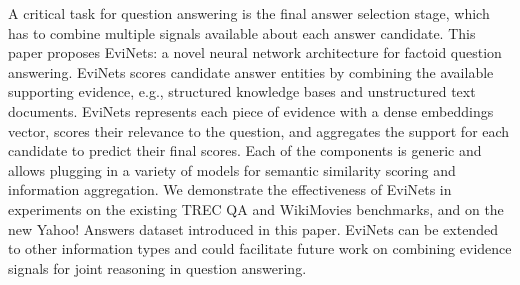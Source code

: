 A critical task for question answering is the final answer selection stage, which has to combine multiple signals available about each answer candidate. This paper proposes EviNets: a novel neural network architecture for factoid question answering. EviNets scores candidate answer entities by combining the available supporting evidence, e.g., structured knowledge bases and unstructured text documents. EviNets represents each piece of evidence with a dense embeddings vector, scores their relevance to the question, and aggregates the support for each candidate to predict their final scores. Each of the components is generic and allows plugging in a variety of models for semantic similarity scoring and information aggregation. We demonstrate the effectiveness of EviNets in experiments on the existing TREC QA and WikiMovies benchmarks, and on the new Yahoo! Answers dataset introduced in this paper. EviNets can be extended to other information types and could facilitate future work on combining evidence signals for joint reasoning in question answering.
